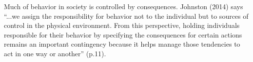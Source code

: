 Much of behavior in society is controlled by consequences. Johnston (2014) says ``...we assign the responsibility for behavior not to the individual but to sources of control in the physical environment. From this perspective, holding individuals responsible for their behavior by specifying the consequences for certain actions remains an important contingency because it helps manage those tendencies to act in one way or another'' (p.11).
%

